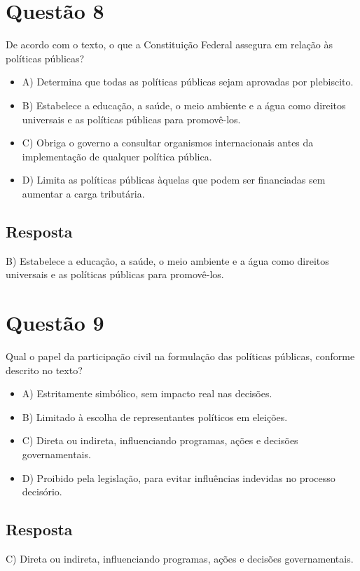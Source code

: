 \documentclass[
   article,       
   12pt,          
   oneside,       
   a4paper,       
   english,       
   brazil,        
   sumario=tradicional
   ]{abntex2}
\begin{document}
\section{Questão 8}
De acordo com o texto, o que a Constituição Federal assegura em relação às políticas públicas?
\begin{itemize}
    \item {A) Determina que todas as políticas públicas sejam aprovadas por plebiscito.}
    \item {B) Estabelece a educação, a saúde, o meio ambiente e a água como direitos universais e as políticas públicas para promovê-los.}
    \item {C) Obriga o governo a consultar organismos internacionais antes da implementação de qualquer política pública.}
    \item {D) Limita as políticas públicas àquelas que podem ser financiadas sem aumentar a carga tributária.}
\end{itemize}

\subsection{Resposta}
B) Estabelece a educação, a saúde, o meio ambiente e a água como direitos universais e as políticas públicas para promovê-los.

\section{Questão 9}
Qual o papel da participação civil na formulação das políticas públicas, conforme descrito no texto?
\begin{itemize}
    \item {A) Estritamente simbólico, sem impacto real nas decisões.}
    \item {B) Limitado à escolha de representantes políticos em eleições.}
    \item {C) Direta ou indireta, influenciando programas, ações e decisões governamentais.}
    \item {D) Proibido pela legislação, para evitar influências indevidas no processo decisório.}
\end{itemize}

\subsection{Resposta}
C) Direta ou indireta, influenciando programas, ações e decisões governamentais.
\end{document}
